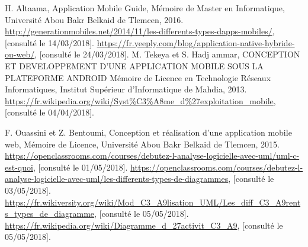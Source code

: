\documentclass[french,a4,12pt]{report}
\begin{document}
\clearpage
\pagestyle{fancy}
\begin{thebibliography}{99}
\lhead{}
\cfoot{\bfseries \thepage}


H. Altaama,
Application Mobile Guide,
Mémoire de Master en Informatique, 
Université Abou Bakr Belkaid de Tlemcen, 
2016.
\url{http://generationmobiles.net/2014/11/les-differents-types-dapps-mobiles/}, [consulté le 14/03/2018].
\url {https://fr.yeeply.com/blog/application-native-hybride-ou-web/}, [consulté le 24/03/2018].
M. Tekeya et S. Hadj ammar,
CONCEPTION ET DEVELOPPEMENT D’UNE APPLICATION MOBILE SOUS LA PLATEFORME ANDROID
Mémoire de Licence en Technologie Réseaux Informatiques, 
Institut Supérieur d'Informatique de Mahdia, 
2013.
\url {https://fr.wikipedia.org/wiki/Syst\%C3\%A8me_d\%27exploitation_mobile}, [consulté le 04/04/2018].

F. Ouassini et Z. Bentoumi, 
Conception et réalisation d’une application mobile web,
Mémoire de Licence,
Université Abou Bakr Belkaid de Tlemcen,
2015.
\url{https://openclassrooms.com/courses/debutez-l-analyse-logicielle-avec-uml/uml-c-est-quoi}, [consulté le 01/05/2018].
\url{https://openclassrooms.com/courses/debutez-l-analyse-logicielle-avec-uml/les-differents-types-de-diagrammes}, [consulté le 03/05/2018].
\url{https://fr.wikiversity.org/wiki/Mod_C3_A9lisation_UML/Les_diff_C3_A9rents_types_de_diagramme}, [consulté le 05/05/2018].
\url{https://fr.wikipedia.org/wiki/Diagramme_d_27activit_C3_A9}, [consulté le 05/05/2018].
\end{thebibliography}
\end{document}
